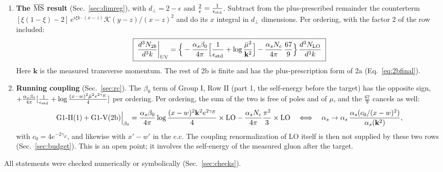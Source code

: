\documentclass[10pt]{article}
\numberwithin{equation}{section}
\newcommand{\KK}{\mathcal K}
\newcommand{\mub}{\bar\mu}
\newcommand{\ve}{\epsilon}
\begin{document}
\begin{enumerate}
\begin{itemize}
\item The plus-prescribed remainder carries $\int_0^1d\xi\,[\xi(1-\xi)-2]=-\frac{11}{6}=-\frac{\beta_0}{2N_c}$. This is the running-coupling part.
\end{itemize}
\item \textbf{The $\overline{\rm MS}$ result} (Sec.~\ref{sec:dimreg}), with $d_\perp=2-\ve$ and $\frac2\ve=\frac1{\ve_{\rm std}}$. Subtract from the plus-prescribed remainder the counterterm $[\xi(1-\xi)-2]\,e^{i\xi k\cdot(x-z)}\KK(y-z)/(x-z)^2$ and do its $x$ integral in $d_\perp$ dimensions. Per ordering, with the factor 2 of the row included:
\begin{equation*}
\boxed{\;\frac{d^3N_{2b}}{d^3k}\bigg|_{\rm UV}=\Big\{-\frac{\alpha_s\beta_0}{4\pi}\Big[\frac{1}{\ve_{\rm std}}+\log\frac{\mub^2}{\mathbf k^2}\Big]-\frac{\alpha_sN_c}{4\pi}\,\frac{67}{9}\Big\}\,\frac{d^3N_{\rm LO}}{d^3k}\;}
\end{equation*}
Here $\mathbf k$ is the measured transverse momentum. The rest of 2b is finite and has the plus-prescription form of 2a (Eq.~\eqref{eq:2bfinal}).
\item \textbf{Running coupling} (Sec.~\ref{sec:rc}). The $\beta_0$ term of Group I, Row II (part 1, the self-energy before the target) has the opposite sign, $+\frac{\alpha_s\beta_0}{4\pi}[\frac{1}{\ve_{\rm std}}+\log\frac{(x-w)^2\mub^2e^{2\gamma_E}}{4}]$ per ordering. Per ordering, the sum of the two is free of poles and of $\mu$, and the $\frac{67}{9}$ cancels as well:
\begin{equation*}
\text{G1-II(1)}+\text{G1-V(2b)}\Big|_{\beta_0}=\frac{\alpha_s\beta_0}{4\pi}\log\frac{(x-w)^2\mathbf k^2e^{2\gamma_E}}{4}\times{\rm LO}-\frac{\alpha_sN_c}{4\pi}\frac{\pi^2}{3}\times{\rm LO}\quad\Longleftrightarrow\quad\alpha_s\to\alpha_s\,\frac{\alpha_s(c_0/(x-w)^2)}{\alpha_s(\mathbf k^2)},
\end{equation*}
with $c_0=4e^{-2\gamma_E}$, and likewise with $x'-w'$ in the c.c. The coupling renormalization of LO itself is then not supplied by these two rows (Sec.~\ref{sec:budget}). This is an open point; it involves the self-energy of the measured gluon after the target.
\end{enumerate}
All statements were checked numerically or symbolically (Sec.~\ref{sec:checks}).

\end{document}

